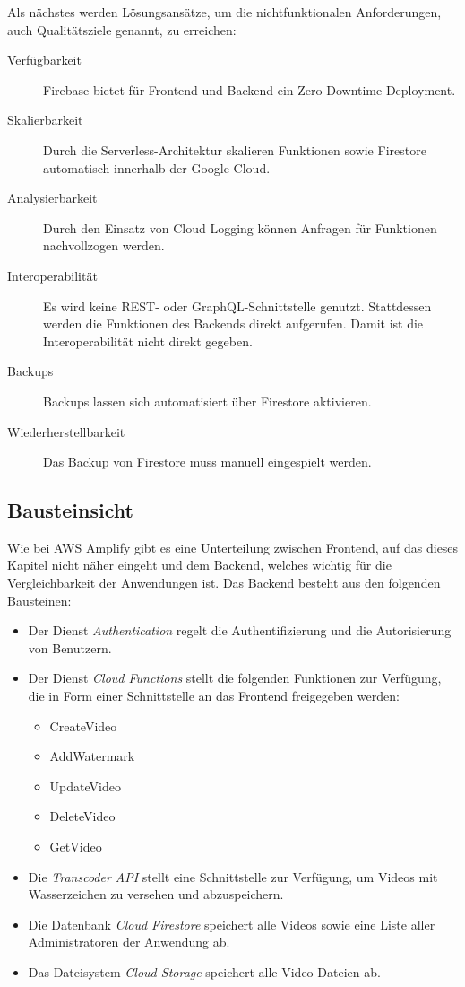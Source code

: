 Als nächstes werden Lösungsansätze, um die nichtfunktionalen Anforderungen, auch Qualitätsziele genannt, zu erreichen:

\begin{description}
   \item[Verfügbarkeit] Firebase bietet für Frontend und Backend ein Zero-Downtime Deployment.
   \item[Skalierbarkeit] Durch die Serverless-Architektur skalieren Funktionen sowie Firestore automatisch innerhalb der Google-Cloud.
   \item[Analysierbarkeit] Durch den Einsatz von Cloud Logging können Anfragen für Funktionen nachvollzogen werden.
   \item[Interoperabilität] Es wird keine REST- oder GraphQL-Schnittstelle genutzt. Stattdessen werden die Funktionen des Backends direkt aufgerufen. Damit ist die Interoperabilität nicht direkt gegeben.
   \item[Backups] Backups lassen sich automatisiert über Firestore aktivieren.
   \item[Wiederherstellbarkeit] Das Backup von Firestore muss manuell eingespielt werden.
\end{description}

\subsection{Bausteinsicht}

Wie bei \ac{AWS} Amplify gibt es eine Unterteilung zwischen Frontend, auf das dieses Kapitel nicht näher eingeht und dem Backend, welches wichtig für die Vergleichbarkeit der Anwendungen ist. Das Backend besteht aus den folgenden Bausteinen:

\begin{itemize}
  \item{Der Dienst \textit{Authentication} regelt die Authentifizierung und die Autorisierung von Benutzern.}
  \item{Der Dienst \textit{Cloud Functions} stellt die folgenden Funktionen zur Verfügung, die in Form einer Schnittstelle an das Frontend freigegeben werden:}
  \begin{itemize}
    \item CreateVideo
    \item AddWatermark
    \item UpdateVideo
    \item DeleteVideo
    \item GetVideo
  \end{itemize}
  \item{Die \textit{Transcoder \ac{API}} stellt eine Schnittstelle zur Verfügung, um Videos mit Wasserzeichen zu versehen und abzuspeichern.}
  \item{Die Datenbank \textit{Cloud Firestore} speichert alle Videos sowie eine Liste aller Administratoren der Anwendung ab.}
  \item{Das Dateisystem \textit{Cloud Storage} speichert alle Video-Dateien ab.}
\end{itemize}


